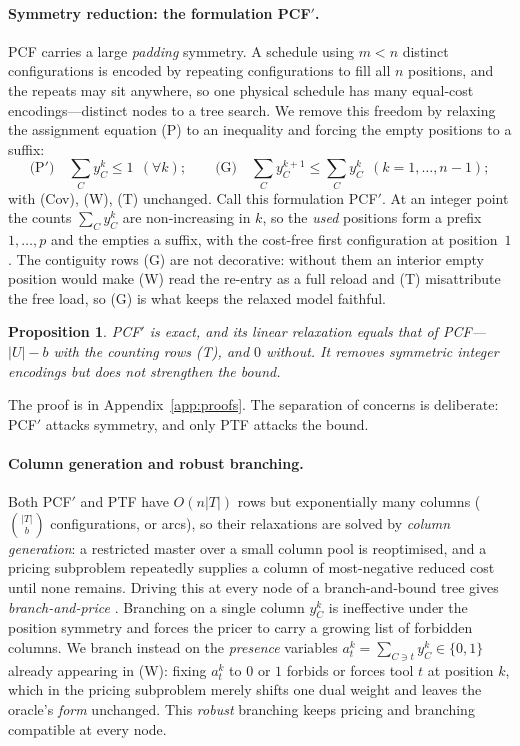 \documentclass[11pt,a4paper]{article}
\theoremstyle{plain}
\newtheorem{proposition}{Proposition}
\theoremstyle{definition}
\theoremstyle{remark}
\newcommand{\U}{U}
\begin{document}
\paragraph{Symmetry reduction: the formulation PCF$'$.}
PCF carries a large \emph{padding} symmetry. A schedule using $m<n$ distinct
configurations is encoded by repeating configurations to fill all $n$ positions, and
the repeats may sit anywhere, so one physical schedule has many equal-cost
encodings---distinct nodes to a tree search. We remove this freedom by relaxing the
assignment equation (P) to an inequality and forcing the empty positions to a suffix:
\[
  \text{(P$'$)}\quad \sum_{C} y_C^{k}\le1\ \ (\forall k);
  \qquad
  \text{(G)}\quad \sum_{C} y_C^{k+1}\le\sum_{C} y_C^{k}\ \ (k=1,\dots,n-1);
\]
with (Cov), (W), (T) unchanged. Call this formulation PCF$'$. At an integer point the
counts $\sum_C y_C^{k}$ are non-increasing in $k$, so the \emph{used} positions form a
prefix $1,\dots,p$ and the empties a suffix, with the cost-free first configuration at
position~$1$. The contiguity rows (G) are not decorative: without them an interior
empty position would make (W) read the re-entry as a full reload and (T) misattribute
the free load, so (G) is what keeps the relaxed model faithful.
\begin{proposition}\label{prop:pcfprime}
PCF$'$ is exact, and its linear relaxation equals that of PCF---$\lvert\U\rvert-b$ with
the counting rows (T), and $0$ without. It removes symmetric integer encodings but
does not strengthen the bound.
\end{proposition}
\noindent The proof is in Appendix~\ref{app:proofs}. The separation of concerns is
deliberate: PCF$'$ attacks symmetry, and only PTF attacks the bound.

\paragraph{Column generation and robust branching.}
Both PCF$'$ and PTF have $O(n\lvert T\rvert)$ rows but exponentially many columns
($\binom{\lvert T\rvert}{b}$ configurations, or arcs), so their relaxations are solved
by \emph{column generation}: a restricted master over a small column pool is
reoptimised, and a pricing subproblem repeatedly supplies a column of most-negative
reduced cost until none remains. Driving this at every node of a branch-and-bound tree
gives \emph{branch-and-price} \citep{Barnhart1998,Lubbecke2005}. Branching on a single
column $y_C^{k}$ is ineffective under the position symmetry and forces the pricer to
carry a growing list of forbidden columns. We branch instead on the \emph{presence}
variables $a_t^{k}=\sum_{C\ni t}y_C^{k}\in\{0,1\}$ already appearing in (W): fixing
$a_t^{k}$ to $0$ or $1$ forbids or forces tool $t$ at position $k$, which in the
pricing subproblem merely shifts one dual weight and leaves the oracle's \emph{form}
unchanged. This \emph{robust} branching keeps pricing and branching compatible at
every node.
\end{document}
